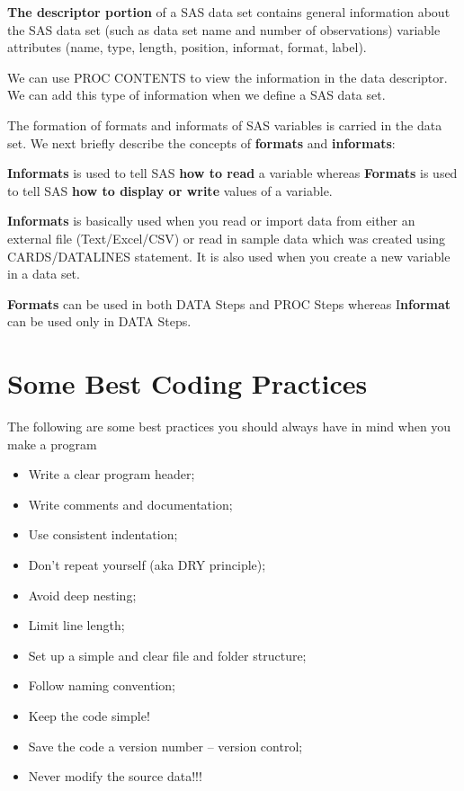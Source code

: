 \documentclass[
]{book}
\providecommand{\tightlist}{%
  \setlength{\itemsep}{0pt}\setlength{\parskip}{0pt}}
\begin{document}
\textbf{The descriptor portion} of a SAS data set contains general information about the SAS data set (such as data set name and number of observations) variable attributes (name, type, length, position, informat, format, label).

We can use PROC CONTENTS to view the information in the data descriptor. We can add this type of information when we define a SAS data set.

The formation of formats and informats of SAS variables is carried in the data set. We next briefly describe the concepts of \textbf{formats} and \textbf{informats}:

\textbf{Informats} is used to tell SAS \textbf{how to read} a variable whereas \textbf{Formats} is used to tell SAS \textbf{how to display or write} values of a variable.

\textbf{Informats} is basically used when you read or import data from either an external file (Text/Excel/CSV) or read in sample data which was created using CARDS/DATALINES statement. It is also used when you create a new variable in a data set.

\textbf{Formats} can be used in both DATA Steps and PROC Steps whereas I\textbf{nformat} can be used only in DATA Steps.

\hypertarget{some-best-coding-practices}{%
\section{Some Best Coding Practices}\label{some-best-coding-practices}}

The following are some best practices you should always have in mind when you make a program

\begin{itemize}
\tightlist
\item
  Write a clear program header;
\item
  Write comments and documentation;
\item
  Use consistent indentation;
\item
  Don't repeat yourself (aka DRY principle);
\item
  Avoid deep nesting;
\item
  Limit line length;
\item
  Set up a simple and clear file and folder structure;
\item
  Follow naming convention;
\item
  Keep the code simple!
\item
  Save the code a version number -- version control;
\item
  Never modify the source data!!!
\end{itemize}
\end{document}
